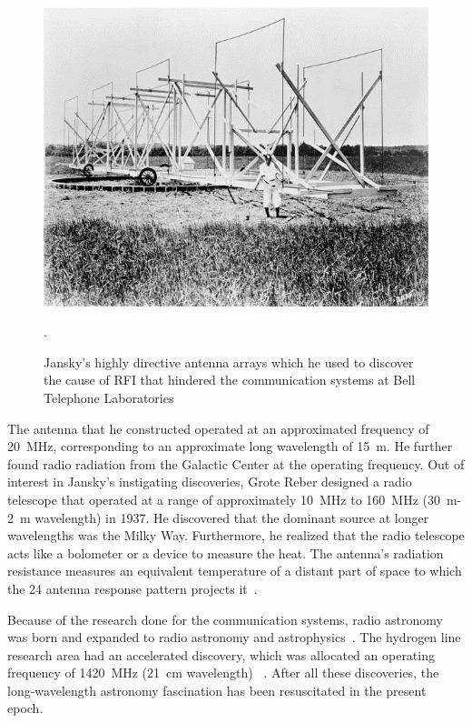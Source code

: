 \begin{figure}
	\begin{center}
		\includegraphics[width=0.7\linewidth]{Figures/jansky1.jpg}
		\caption{Jansky's highly directive antenna arrays which he used to discover the cause of RFI that hindered the communication systems at Bell Telephone Laboratories~\citep{book:BasicsofRA}}.
		\label{Fig:Jansky}
	\end{center}
\end{figure}

The antenna that he constructed operated at an approximated frequency of \SI{20}{MHz}, corresponding to an approximate long wavelength of \SI{15}{m}. He further found radio radiation from the Galactic Center at the operating frequency. Out of interest in Jansky's instigating discoveries, Grote Reber designed a radio telescope that operated at a range of approximately \SI{10}{MHz} to \SI{160}{MHz} (\SI{30}{m}-\SI{2}{m} wavelength) in 1937. He discovered that the dominant source at longer wavelengths was the Milky Way. Furthermore, he realized that the radio telescope acts like a bolometer or a device to measure the heat. The antenna's radiation resistance measures an equivalent temperature of a distant part of space to which the 24 antenna response pattern projects it~\citep{1988JRASC..82...93R, CosmicStatic,2012PASP..124.1090H}.

Because of the research done for the communication systems, radio astronomy was born and expanded to radio astronomy and astrophysics~\citep{2012PASP..124.1090H}. The hydrogen line research area had an accelerated discovery, which was allocated an operating frequency of \SI{1420}{MHz} (\SI{21}{cm} wavelength) ~\citep{10.2307/530765}. After all these discoveries, the long-wavelength astronomy fascination has been resuscitated in the present epoch.

